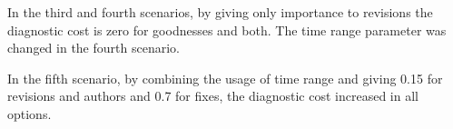In the third and fourth scenarios, by giving only importance to revisions the diagnostic cost is zero for goodnesses and both. The time range parameter was changed in the fourth scenario.

In the fifth scenario, by combining the usage of time range and giving 0.15 for revisions and authors and 0.7 for fixes, the diagnostic cost increased in all options.